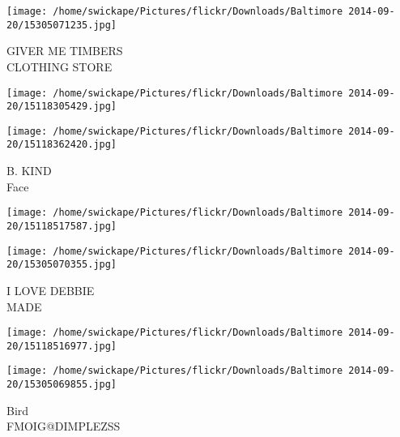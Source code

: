 \documentclass[10pt,letterpaper]{article}
\begin{document}
\vspace{0.25in}
\texttt{[image: /home/swickape/Pictures/flickr/Downloads/Baltimore 2014-09-20/15305071235.jpg]}

GIVER ME TIMBERS\\
CLOTHING STORE
\pagebreak

\texttt{[image: /home/swickape/Pictures/flickr/Downloads/Baltimore 2014-09-20/15118305429.jpg]}

\vspace{0.25in}
\texttt{[image: /home/swickape/Pictures/flickr/Downloads/Baltimore 2014-09-20/15118362420.jpg]}

B. KIND\\
Face
\pagebreak

\texttt{[image: /home/swickape/Pictures/flickr/Downloads/Baltimore 2014-09-20/15118517587.jpg]}

\vspace{0.25in}
\texttt{[image: /home/swickape/Pictures/flickr/Downloads/Baltimore 2014-09-20/15305070355.jpg]}

I LOVE DEBBIE\\
MADE
\pagebreak

\texttt{[image: /home/swickape/Pictures/flickr/Downloads/Baltimore 2014-09-20/15118516977.jpg]}

\vspace{0.25in}
\texttt{[image: /home/swickape/Pictures/flickr/Downloads/Baltimore 2014-09-20/15305069855.jpg]}

Bird\\
FMOIG@DIMPLEZSS
\pagebreak
\end{document}
